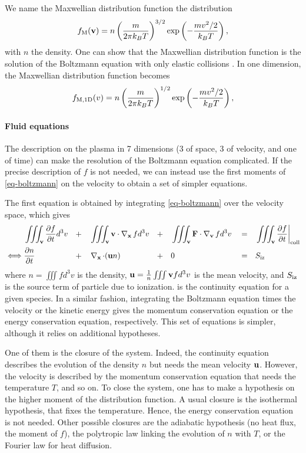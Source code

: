 We name the Maxwellian distribution function the distribution
\begin{equation} \label{eq-Maxwelliantwo}
  f_{\rm M}({\mathbf v}) = n \left( \frac{m}{2 \pi k_B T}\right)^{3/2} \exp \left( - \frac{ m v^2/2}{k_B T } \right),
\end{equation}
with $n$ the density.
One can show that the Maxwellian distribution function is the solution of the Boltzmann equation with only elastic collisions \citep{lieberman2005}.
In one dimension, the Maxwellian distribution function becomes
\begin{equation}
  f_{\rm M, 1D}(v) =  n \left(\frac{m}{2 \pi k_B T}\right)^{1/2} \exp \left( - \frac{ m v^2/2}{k_B T } \right),
\end{equation}

\paragraph{Fluid equations \\}
The description on the plasma in 7 dimensions (3 of space, 3 of velocity, and one of time) can make the resolution of the Boltzmann equation complicated.
If the precise description of $f$ is not needed, we can instead use the first moments of \cref{eq-boltzmann} on the velocity to obtain a set of simpler equations.

The first equation is obtained by integrating \cref{eq-boltzmann} over the velocity space, which gives
\begin{align}
    & \iiint_{{\mathbf v}}  \frac{\partial f}{\partial t} d^3v &&+&& \iiint_{{\mathbf v}}  {\mathbf v} \cdot \operatorname{{\mathbf \nabla}}_{{\mathbf x}} f  d^3v &&+&&  \iiint_{{\mathbf v}}  {\mathbf F} \cdot  \operatorname{{\mathbf \nabla}}_{{\mathbf v}} f  d^3v && = && \iiint_{{\mathbf v}}  \frac{\partial f}{\partial t}  \bigg\vert_{\rm coll}  \nonumber  \\ 
   \iff &  \frac{\partial n}{\partial t} &&+&&  \operatorname{{\mathbf \nabla}}_{{\mathbf x}}  \cdot  ( {\mathbf u} n) &&+&& 0 &&=&& S_{\rm iz}   \label{eq-conc}
\end{align} 
where $n=\iiint f d^3v$ is the density, ${\mathbf u} = \frac{1}{n} \iiint {\mathbf v} f d^3v$ is the mean velocity, and $S_{\rm iz}$ is the source term of particle due to ionization.
 is the continuity equation for a given species.
In a similar fashion, integrating the Boltzmann equation times the velocity or the kinetic energy gives the momentum conservation equation or the energy conservation equation, respectively.
This set of equations is simpler, although it relies on additional hypotheses.

One of them is the closure of the system.
Indeed, the continuity equation describes the evolution of the density $n$ but needs the mean velocity ${\mathbf u}$.
However, the velocity is described by the momentum conservation equation that needs the temperature $T$, and so on.
To close the system, one has to make a hypothesis on the higher moment of the distribution function.
A usual closure is the isothermal hypothesis, that fixes the temperature. 
Hence, the energy conservation equation is not needed.
Other possible closures are the adiabatic hypothesis (no heat flux, the  moment of $f$), the polytropic law linking the evolution of $n$ with $T$, or the Fourier law for heat diffusion.

